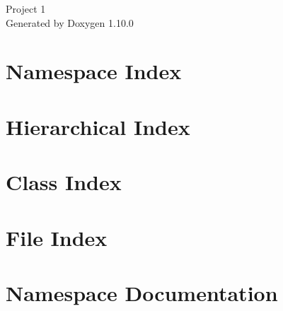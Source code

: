 \documentclass[twoside]{book}
\newcommand{\+}{\discretionary{\mbox{\scriptsize$\hookleftarrow$}}{}{}}
\newcommand{\clearemptydoublepage}{%
    \newpage{\pagestyle{empty}\cleardoublepage}%
  }
\begin{document}
  \raggedbottom
    \hypersetup{pageanchor=false,
                bookmarksnumbered=true,
                pdfencoding=unicode
               }
  \begin{titlepage}
  \vspace*{7cm}
  \begin{center}%
  {\Large Project 1}\\
  \vspace*{1cm}
  {\large Generated by Doxygen 1.10.0}\\
  \end{center}
  \end{titlepage}
  \clearemptydoublepage
  \tableofcontents
  \clearemptydoublepage
  \hypersetup{pageanchor=true}
\chapter{Namespace Index}

\chapter{Hierarchical Index}

\chapter{Class Index}

\chapter{File Index}

\chapter{Namespace Documentation}


\end{document}

